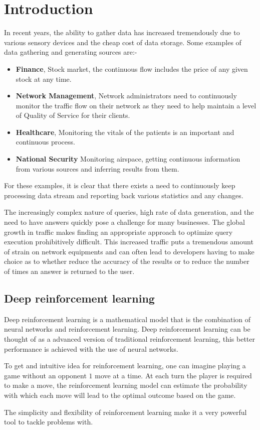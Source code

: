\chapter{Introduction}
\label{chapter:Introduction}
\thispagestyle{myheadings}
In recent years, the ability to gather data has increased tremendously due to various sensory devices and the cheap cost of data storage. Some examples of data gathering and generating sources are:-
\begin{itemize}
    \item \textbf{Finance}, Stock market, the continuous flow includes the price of any given stock at any time. 
    \item \textbf{Network Management}, Network administrators need to continuously monitor the traffic flow on their network as they need to help maintain a level of Quality of Service for their clients.
    \item \textbf{Healthcare}, Monitoring the vitals of the patients is an important and continuous process. 
    \item \textbf{National Security} Monitoring airspace, getting continuous information from various sources and inferring results from them.
\end{itemize} 
For these examples, it is clear that there exists a need to continuously keep processing data stream and reporting back various statistics and any changes.
\par The increasingly complex nature of queries, high rate of data generation, and the need to have answers quickly pose a challenge for many businesses. The global growth in traffic makes finding an appropriate approach to optimize query execution prohibitively difficult. This increased traffic puts a tremendous amount of strain on network equipments and can often lead to developers having to make choice as to whether reduce the accuracy of the results or to reduce the number of times an answer is returned to the user.  

\section{Deep reinforcement learning}
Deep reinforcement learning is a mathematical model that is the combination of neural networks and reinforcement learning. Deep reinforcement learning can be thought of as a advanced version of traditional reinforcement learning, this better performance is achieved with the use of neural networks.
\par To get and intuitive idea for reinforcement learning, one can imagine playing a game without an opponent $1$ move at a time. At each turn the player is required to make a move, the reinforcement learning model can estimate the probability with which each move will lead to the optimal outcome based on the game.
\par The simplicity and flexibility of reinforcement learning make it a very powerful tool to tackle problems with. 
